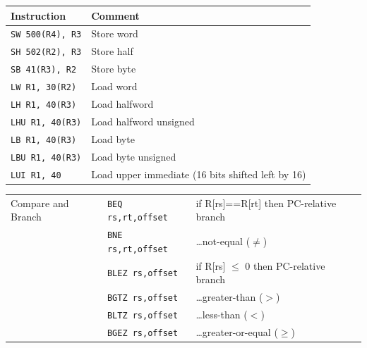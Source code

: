 \begin{center}
\begin{tabular}{@{}ll@{}}
\toprule
Instruction & Comment \\
\midrule
\texttt{SW 500(R4), R3} & Store word \\
\texttt{SH 502(R2), R3} & Store half \\
\texttt{SB 41(R3), R2}  & Store byte \\
\texttt{LW R1, 30(R2)}  & Load word \\
\texttt{LH R1, 40(R3)}  & Load halfword \\
\texttt{LHU R1, 40(R3)} & Load halfword unsigned \\
\texttt{LB R1, 40(R3)}  & Load byte \\
\texttt{LBU R1, 40(R3)} & Load byte unsigned \\
\texttt{LUI R1, 40}     & Load upper immediate (16 bits shifted left by 16) \\
\bottomrule
\end{tabular}
\end{center}

\begin{center}
\begin{tabular}{@{}lll@{}}
\toprule
& & \\
\midrule
Compare and Branch & \texttt{BEQ rs,rt,offset} & if R[rs]==R[rt] then PC-relative branch \\
                    & \texttt{BNE rs,rt,offset} & \dots not-equal ($\neq$) \\
                    & \texttt{BLEZ rs,offset}   & if R[rs] $\le$ 0 then PC-relative branch \\
                    & \texttt{BGTZ rs,offset}   & \dots greater-than ($>$) \\
                    & \texttt{BLTZ rs,offset}   & \dots less-than ($<$) \\
                    & \texttt{BGEZ rs,offset}   & \dots greater-or-equal ($\ge$) \\
\bottomrule
\end{tabular}
\end{center}


